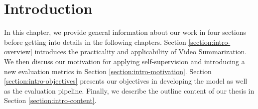 \chapter{Introduction}
\label{chapter:introduction}

\begin{ChapAbstract}
    In this chapter, we provide general information about our work in four sections before getting into details in the following chapters. Section \ref{section:intro-overview} introduces the practicality and applicability of Video Summarization. We then discuss our motivation for applying self-supervision and introducing a new evaluation metrics in Section \ref{section:intro-motivation}. Section \ref{section:intro-objectives} presents our objectives in developing the model as well as the evaluation pipeline. Finally, we describe the outline content of our thesis in Section \ref{section:intro-content}.
\end{ChapAbstract}




